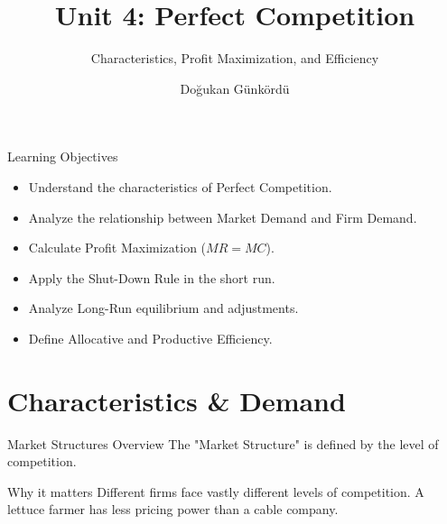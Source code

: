 \documentclass[aspectratio=169, 10pt]{beamer}
\title{Unit 4: Perfect Competition}
\subtitle{Characteristics, Profit Maximization, and Efficiency}
\author{Doğukan Günkördü}
\date{}
\begin{document}
\begin{frame}
    \titlepage
\end{frame}

\begin{frame}{Learning Objectives}
    \begin{itemize}
        \item Understand the characteristics of Perfect Competition.
        \item Analyze the relationship between Market Demand and Firm Demand.
        \item Calculate Profit Maximization ($MR = MC$).
        \item Apply the Shut-Down Rule in the short run.
        \item Analyze Long-Run equilibrium and adjustments.
        \item Define Allocative and Productive Efficiency.
    \end{itemize}
\end{frame}

\section{Characteristics \& Demand}

\begin{frame}{Market Structures Overview}
    The "Market Structure" is defined by the level of competition.
    \vspace{0.5cm}
    
    \begin{center}
    \end{center}
    
    \begin{block}{Why it matters}
    Different firms face vastly different levels of competition. A lettuce farmer has less pricing power than a cable company.
    \end{block}
\end{frame}
\end{document}
